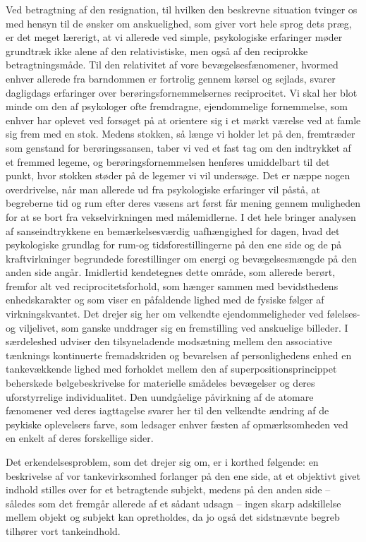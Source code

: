 Ved betragtning af den resignation, til hvilken den beskrevne situation tvinger os med hensyn til de ønsker om anskuelighed, som giver vort hele sprog dets præg, er det meget lærerigt, at vi allerede ved simple, psykologiske erfaringer møder grundtræk ikke alene af den relativistiske, men også af den reciprokke betragtningsmåde. Til den relativitet af vore bevægelsesfænomener, hvormed enhver allerede fra barndommen er fortrolig gennem kørsel og sejlads, svarer dagligdags erfaringer over berøringsfornemmelsernes reciprocitet. Vi skal her blot minde om den af psykologer ofte fremdragne, ejendommelige fornemmelse, som enhver har oplevet ved forsøget på at orientere sig i et mørkt værelse ved at famle sig frem med en stok. Medens stokken, så længe vi holder let på den, fremtræder som genstand for berøringssansen, taber vi ved et fast tag om den indtrykket af et fremmed legeme, og berøringsfornemmelsen henføres umiddelbart til det punkt, hvor stokken støder på de legemer vi vil undersøge. Det er næppe nogen overdrivelse, når man allerede ud fra psykologiske erfaringer vil påstå, at begreberne tid og rum efter deres væsens art først får mening gennem muligheden for at se bort fra vekselvirkningen med målemidlerne. I det hele bringer analysen af sanseindtrykkene en bemærkelsesværdig uafhængighed for dagen, hvad det psykologiske grundlag for rum-og tidsforestillingerne på den ene side og de på kraftvirkninger begrundede forestillinger om energi og bevægelsesmængde på den anden side angår. Imidlertid kendetegnes dette område, som allerede berørt, fremfor alt ved reciprocitetsforhold, som hænger sammen med bevidsthedens enhedskarakter og som viser en påfaldende lighed med de fysiske følger af virkningskvantet. Det drejer sig her om velkendte ejendommeligheder ved følelses-og viljelivet, som ganske unddrager sig en fremstilling ved anskuelige billeder. I særdeleshed udviser den tilsyneladende modsætning mellem den associative tænknings kontinuerte fremadskriden og bevarelsen af personlighedens enhed en tankevækkende lighed med forholdet mellem den af superpositionsprincippet beherskede bølgebeskrivelse for materielle smådeles bevægelser og deres uforstyrrelige individualitet. Den uundgåelige påvirkning af de atomare fænomener ved deres iagttagelse svarer her til den velkendte ændring af de psykiske oplevelsers farve, som ledsager enhver fæsten af opmærksomheden ved en enkelt af deres forskellige sider.


Det erkendelsesproblem, som det drejer sig om, er i korthed følgende: en beskrivelse af vor tankevirksomhed forlanger på den ene side, at et objektivt givet indhold stilles over for et betragtende subjekt, medens på den anden side – således som det fremgår allerede af et sådant udsagn – ingen skarp adskillelse mellem objekt og subjekt kan opretholdes, da jo også det sidstnævnte begreb tilhører vort tankeindhold.


